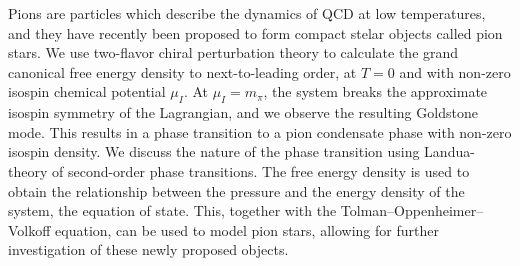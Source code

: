 Pions are particles which describe the dynamics of QCD at low temperatures, and they have recently been proposed to form compact stelar objects called pion stars.
We use two-flavor chiral perturbation theory to calculate the grand canonical free energy density to next-to-leading order, at $T = 0$ and with non-zero isospin chemical potential $\mu_I$.
At $\mu_I = m_\pi$, the system breaks the approximate isospin symmetry of the Lagrangian, and we observe the resulting Goldstone mode.
This results in a phase transition to a pion condensate phase with non-zero isospin density.
We discuss the nature of the phase transition using Landua-theory of second-order phase transitions.
The free energy density is used to obtain the relationship between the pressure and the energy density of the system, the equation of state.
This, together with the Tolman–Oppenheimer–Volkoff equation, can be used to model pion stars, allowing for further investigation of these newly proposed objects.
